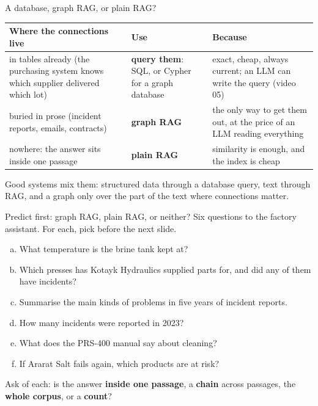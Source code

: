 \documentclass[aspectratio=169]{beamer}
\newcommand{\keybox}[1]{%
  \begin{tcolorbox}[colback=armblue!8, colframe=armblue, boxrule=0.6pt, arc=2pt]
  #1
  \end{tcolorbox}}
\newcommand{\takebox}[1]{%
  \begin{tcolorbox}[colback=paramgreen!8, colframe=paramgreen, boxrule=0.6pt, arc=2pt]
  #1
  \end{tcolorbox}}
\begin{document}
\begin{frame}{A database, graph RAG, or plain RAG?}
  \vspace{0.2em}
  \begin{center}
  \small
  \begin{tabular}{>{\raggedright\arraybackslash}p{}>{\raggedright\arraybackslash}p{}>{\raggedright\arraybackslash}p{}}
    \toprule
    \textbf{Where the connections live} & \textbf{Use} & \textbf{Because} \\
    \midrule
    in tables already (the purchasing system knows which supplier delivered which lot) &
      \textbf{query them}: SQL, or Cypher for a graph database &
      exact, cheap, always current; an LLM can write the query (video 05) \\
    buried in prose (incident reports, emails, contracts) & \textbf{graph RAG} &
      the only way to get them out, at the price of an LLM reading everything \\
    nowhere: the answer sits inside one passage & \textbf{plain RAG} &
      similarity is enough, and the index is cheap \\
    \bottomrule
  \end{tabular}
  \end{center}

  \vspace{0.4em}
  \takebox{\small Good systems mix them: structured data through a database query, text through
  RAG, and a graph only over the part of the text where connections matter.}
\end{frame}

\begin{frame}{Predict first: graph RAG, plain RAG, or neither?}
  \vspace{0.2em}
  Six questions to the factory assistant. For each, pick before the next slide.

  \vspace{0.3em}
  \begin{enumerate}[a.]\setlength{\itemsep}{3pt}
    \item What temperature is the brine tank kept at?
    \item Which presses has Kotayk Hydraulics supplied parts for, and did any of them have incidents?
    \item Summarise the main kinds of problems in five years of incident reports.
    \item How many incidents were reported in 2023?
    \item What does the PRS-400 manual say about cleaning?
    \item If Ararat Salt fails again, which products are at risk?
  \end{enumerate}

  \vspace{0.3em}
  \keybox{\small Ask of each: is the answer \textbf{inside one passage}, a \textbf{chain} across
  passages, the \textbf{whole corpus}, or a \textbf{count}?}
\end{frame}
\end{document}

